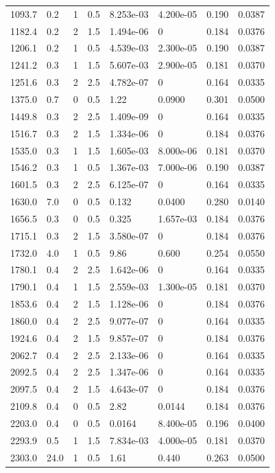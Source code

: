 \documentclass[preview]{standalone}
\begin{document}
{{\begin{tabular}{L{1.2cm}C{1.2cm} C{0.3cm}C{0.5cm} C{1.4cm}C{1.4cm} C{1.4cm}C{1.4cm}}
  1093.7  &   0.2  & 1     & 0.5 &  8.253e-03  & 4.200e-05  & 0.190 &  0.0387   \\ 
  1182.4  &   0.2  & 2     & 1.5 &  1.494e-06  & 0  & 0.184 &  0.0376   \\ 
  1206.1  &   0.2  & 1     & 0.5 &  4.539e-03  & 2.300e-05  & 0.190 &  0.0387   \\ 
  1241.2  &   0.3  & 1     & 1.5 &  5.607e-03  & 2.900e-05  & 0.181 &  0.0370   \\ 
  1251.6  &   0.3  & 2     & 2.5 &  4.782e-07  & 0  & 0.164 &  0.0335   \\ 
  1375.0  &   0.7  & 0     & 0.5 &  1.22  & 0.0900  & 0.301 &  0.0500   \\ 
  1449.8  &   0.3  & 2     & 2.5 &  1.409e-09  & 0  & 0.164 &  0.0335   \\ 
  1516.7  &   0.3  & 2     & 1.5 &  1.334e-06  & 0  & 0.184 &  0.0376   \\ 
  1535.0  &   0.3  & 1     & 1.5 &  1.605e-03  & 8.000e-06  & 0.181 &  0.0370   \\ 
  1546.2  &   0.3  & 1     & 0.5 &  1.367e-03  & 7.000e-06  & 0.190 &  0.0387   \\ 
  1601.5  &   0.3  & 2     & 2.5 &  6.125e-07  & 0  & 0.164 &  0.0335   \\ 
  1630.0  &   7.0  & 0     & 0.5 &  0.132  & 0.0400  & 0.280 &  0.0140   \\ 
  1656.5  &   0.3  & 0     & 0.5 &  0.325  & 1.657e-03  & 0.184 &  0.0376   \\ 
  1715.1  &   0.3  & 2     & 1.5 &  3.580e-07  & 0  & 0.184 &  0.0376   \\ 
  1732.0  &   4.0  & 1     & 0.5 &  9.86  & 0.600  & 0.254 &  0.0550   \\ 
  1780.1  &   0.4  & 2     & 2.5 &  1.642e-06  & 0  & 0.164 &  0.0335   \\ 
  1790.1  &   0.4  & 1     & 1.5 &  2.559e-03  & 1.300e-05  & 0.181 &  0.0370   \\ 
  1853.6  &   0.4  & 2     & 1.5 &  1.128e-06  & 0  & 0.184 &  0.0376   \\ 
  1860.0  &   0.4  & 2     & 2.5 &  9.077e-07  & 0  & 0.164 &  0.0335   \\ 
  1924.6  &   0.4  & 2     & 1.5 &  9.857e-07  & 0  & 0.184 &  0.0376   \\ 
  2062.7  &   0.4  & 2     & 2.5 &  2.133e-06  & 0  & 0.164 &  0.0335   \\ 
  2092.5  &   0.4  & 2     & 2.5 &  1.347e-06  & 0  & 0.164 &  0.0335   \\ 
  2097.5  &   0.4  & 2     & 1.5 &  4.643e-07  & 0  & 0.184 &  0.0376   \\ 
  2109.8  &   0.4  & 0     & 0.5 &  2.82  & 0.0144  & 0.184 &  0.0376   \\ 
  2203.0  &   0.4  & 0     & 0.5 &  0.0164  & 8.400e-05  & 0.196 &  0.0400   \\ 
  2293.9  &   0.5  & 1     & 1.5 &  7.834e-03  & 4.000e-05  & 0.181 &  0.0370   \\ 
  2303.0  &  24.0  & 1     & 0.5 &  1.61  & 0.440  & 0.263 &  0.0500   \\ 
\hline 
\end{tabular} 

}}
\end{document}
